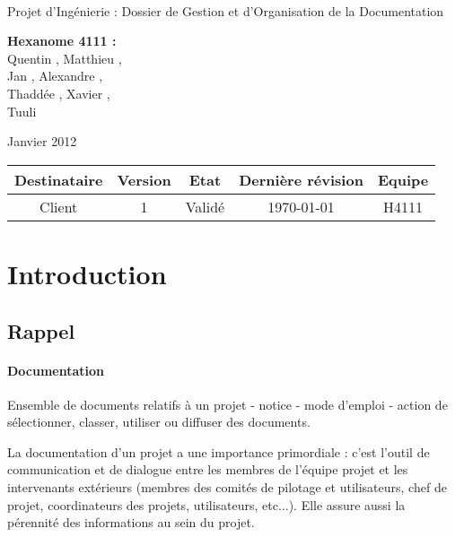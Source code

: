 \documentclass[a4paper]{article}
\begin{document}
\begin{titlepage}
~ 
\vfill
	\begin{center}
		\begin{Huge}
		Projet d'Ingénierie : Dossier de Gestion et d'Organisation de la Documentation\\
		\end{Huge} 
\vfill
		\textbf{Hexanome 4111 :} 
		\\Quentin {}, Matthieu , 
		\\Jan {}, Alexandre , 
		\\Thaddée , Xavier ,
		\\Tuuli {}
\vfill		
		\begin{Large}
		Janvier 2012
		\end{Large}
\vfill
	\begin{tabular}{|c|c|c|c|c|}
 	 \hline
   Destinataire & Version & Etat & Dernière révision & Equipe \\
   \hline
   Client & 1 & Validé & \today & H4111 \\
   \hline
	\end{tabular}
	\end{center}
\vfill
\end{titlepage}
\newpage
\tableofcontents
\newpage

\section{Introduction}

\subsection{Rappel}

\paragraph{Documentation} Ensemble de documents relatifs à un projet - notice - mode d’emploi - action de sélectionner, classer, utiliser ou diffuser des documents.

La documentation d’un projet a une importance primordiale : c’est l’outil de communication et de dialogue entre les membres de l’équipe projet et les intervenants extérieurs (membres des comités de pilotage et utilisateurs, chef de projet, coordinateurs des projets, utilisateurs, etc...). Elle assure aussi la pérennité des informations au sein du projet.
\end{document}
